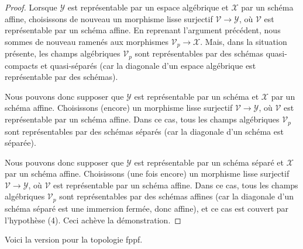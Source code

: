 \begin{proof}
\medskip\noindent
Lorsque $\mathcal{Y}$ est représentable par un espace
algébrique et $\mathcal{X}$ par un schéma affine, choisissons
de nouveau un morphisme lisse surjectif $\mathcal{V} \to \mathcal{Y}$, où
$\mathcal{V}$ est représentable par un schéma affine. En reprenant
l'argument précédent, nous sommes de nouveau ramenés aux morphismes
$\mathcal{V}_p \to \mathcal{X}$. Mais, dans la situation présente, les champs
algébriques $\mathcal{V}_p$ sont représentables par des schémas quasi-compacts et quasi-séparés
(car la diagonale d'un espace algébrique est représentable par des
schémas).

\medskip\noindent
Nous pouvons donc supposer que $\mathcal{Y}$ est représentable par un schéma et
$\mathcal{X}$ par un schéma affine. Choisissons (encore)
un morphisme lisse surjectif $\mathcal{V} \to \mathcal{Y}$, où
$\mathcal{V}$ est représentable par un schéma affine. Dans ce cas, tous
les champs algébriques $\mathcal{V}_p$ sont représentables par des schémas
séparés (car la diagonale d'un schéma est séparée).

\medskip\noindent
Nous pouvons donc supposer que $\mathcal{Y}$ est représentable par un schéma séparé et
$\mathcal{X}$ par un schéma affine. Choisissons (une fois encore)
un morphisme lisse surjectif $\mathcal{V} \to \mathcal{Y}$, où
$\mathcal{V}$ est représentable par un schéma affine. Dans ce cas, tous
les champs algébriques $\mathcal{V}_p$ sont représentables par des schémas affines
(car la diagonale d'un schéma séparé est une immersion fermée, donc affine),
et ce cas est couvert par l'hypothèse (4).
Ceci achève la démonstration.
\end{proof}

\noindent
Voici la version pour la topologie fppf.

